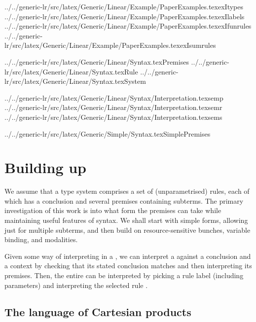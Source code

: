 \def\prefix{../../generic-lr/src/latex}

\CatchFileBetweenTags{\exItypes}%
{\prefix/Generic/Linear/Example/PaperExamples.tex}{exItypes}
\CatchFileBetweenTags{\exIlabels}%
{\prefix/Generic/Linear/Example/PaperExamples.tex}{exIlabels}
\CatchFileBetweenTags{\exIfunrules}%
{\prefix/Generic/Linear/Example/PaperExamples.tex}{exIfunrules}
\CatchFileBetweenTags{\exIsumrules}%
{\prefix/Generic/Linear/Example/PaperExamples.tex}{exIsumrules}

\CatchFileBetweenTags{\Premises}%
{\prefix/Generic/Linear/Syntax.tex}{Premises}
\CatchFileBetweenTags{\Rule}%
{\prefix/Generic/Linear/Syntax.tex}{Rule}
\CatchFileBetweenTags{\System}%
{\prefix/Generic/Linear/Syntax.tex}{System}

\CatchFileBetweenTags{\semp}%
{\prefix/Generic/Linear/Syntax/Interpretation.tex}{semp}
\CatchFileBetweenTags{\semr}%
{\prefix/Generic/Linear/Syntax/Interpretation.tex}{semr}
\CatchFileBetweenTags{\sems}%
{\prefix/Generic/Linear/Syntax/Interpretation.tex}{sems}

\CatchFileBetweenTags{\SimplePremises}%
{\prefix/Generic/Simple/Syntax.tex}{SimplePremises}

\section{Building up}

We assume that a type system comprises a set of (unparametrised) rules, each
of which has a conclusion and several premises containing subterms.
The primary investigation of this work is into what form the premises can take
while maintaining useful features of syntax.
We shall start with simple forms, allowing just for multiple subterms, and
then build on resource-sensitive bunches, variable binding, and modalities.

\System{}
\Rule{}

Given some way  of interpreting
 in a , we can interpret a
 against a conclusion and a context by checking that its
stated conclusion matches and then interpreting its premises.
Then, the entire  can be interpreted by picking a rule
label (including parameters)  and interpreting the selected rule
\AgdaSpace{}.

\semr{}
\sems{}

\subsection{The language of Cartesian products}


